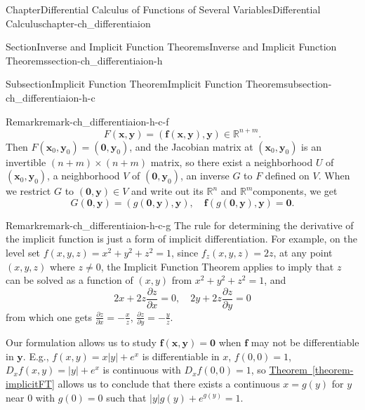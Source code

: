 \documentclass[oneside,10pt,]{book}
\newcommand{\xreffont}{\relax}
\numberwithin{equation}{section}
\newcommand{\bff}{\mathbf{f}}
\newcommand{\bx}{\mathbf{x}}
\newcommand{\by}{\mathbf{y}}
\newcommand{\bbR}{\mathbb{R}}
\begin{document}
\begin{chapterptx}{Chapter}{Differential Calculus of Functions of Several Variables}{}{Differential Calculus}{}{}{chapter-ch_differentiaion}
\begin{sectionptx}{Section}{Inverse and Implicit Function Theorems}{}{Inverse and Implicit Function Theorems}{}{}{section-ch_differentiaion-h}
\begin{subsectionptx}{Subsection}{Implicit Function Theorem}{}{Implicit Function Theorem}{}{}{subsection-ch_differentiaion-h-c}
\begin{remark}{Remark}{}{remark-ch_differentiaion-h-c-f}
\begin{equation*}
F(\bx, \by)=(\bff (\bx, \by), \by)\in \bbR^{n+m}\text{.}
\end{equation*}
Then \(F(\bx_{0}, \by_{0})=(\mathbf 0, \by_{0})\), and the Jacobian matrix at \((\bx_{0}, \by_{0})\) is an invertible \((n+m)\times (n+m)\) matrix, so there exist a neighborhood \(U\) of \((\bx_{0}, \by_{0})\),  a neighborhood \(V\) of \((\mathbf 0, \by_{0})\), an inverse \(G\) to \(F\) defined on \(V\). When we restrict \(G\) to \((\mathbf 0, \by)\in V\) and write out its \(\bbR^{n}\) and \(\bbR^{m}\)components, we get%
\begin{equation*}
G(\mathbf 0, \by)=(g(\mathbf 0, \by), \by), \quad \bff(g(\mathbf 0, \by),\by)=\mathbf 0.
\end{equation*}
\end{remark}
\begin{remark}{Remark}{}{remark-ch_differentiaion-h-c-g}%
The rule for determining	the derivative of the implicit function is just a form of implicit differentiation. For example, on the level set \(f(x, y, z)=x^{2}+y^{2}+z^{2}=1\), since \(f_{z}(x, y, z)=2z\), at any point \((x, y, z)\) where \(z\ne 0\), the Implicit Function Theorem applies to imply that \(z\) can be solved as a function of \((x, y)\) from \(x^{2}+y^{2}+z^{2}=1\), and%
\begin{equation*}
2x + 2z \frac{\partial z}{\partial x} =0,\quad 2y + 2z \frac{\partial z}{\partial y} =0
\end{equation*}
from which one gets \(\frac{\partial z}{\partial x} =-\frac xz\), \(\frac{\partial z}{\partial y} =-\frac yz\).%
\par
Our formulation allows us to study \(\bff (\bx, \by)=\mathbf 0\) when \(\bff\) may not be differentiable in \(\by\). E.g., \(f(x, y)=x |y|+e^{x}\) is differentiable in \(x\), \(f(0, 0)=1\), \(D_{x}f(x, y)=|y|+e^{x}\) is continuous with \(D_{x}f(0, 0)=1\), so \hyperref[theorem-implicitFT]{Theorem~{\xreffont\ref{theorem-implicitFT}}} allows us to conclude that there exists a continuous \(x=g(y)\) for \(y\) near \(0\) with \(g(0)=0\) such that \(|y|g(y)+e^{g(y)}=1\).%
\par

\end{remark}
\end{subsectionptx}
\end{sectionptx}
\end{chapterptx}
\end{document}

